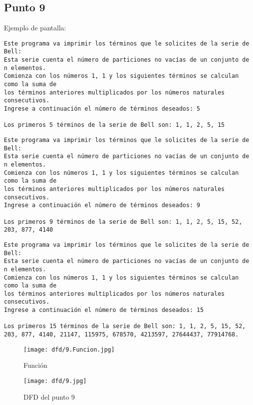 



\subsection{Punto 9}
	
	Ejemplo de pantalla:
\begin{lstlisting}
Este programa va imprimir los términos que le solicites de la serie de Bell: 
Esta serie cuenta el número de particiones no vacías de un conjunto de n elementos. 
Comienza con los números 1, 1 y los siguientes términos se calculan como la suma de 
los términos anteriores multiplicados por los números naturales consecutivos.
Ingrese a continuación el número de términos deseados: 5

Los primeros 5 términos de la serie de Bell son: 1, 1, 2, 5, 15
\end{lstlisting}

\begin{lstlisting}
Este programa va imprimir los términos que le solicites de la serie de Bell: 
Esta serie cuenta el número de particiones no vacías de un conjunto de n elementos. 
Comienza con los números 1, 1 y los siguientes términos se calculan como la suma de 
los términos anteriores multiplicados por los números naturales consecutivos.
Ingrese a continuación el número de términos deseados: 9

Los primeros 9 términos de la serie de Bell son: 1, 1, 2, 5, 15, 52, 203, 877, 4140
\end{lstlisting}

\begin{lstlisting}
Este programa va imprimir los términos que le solicites de la serie de Bell: 
Esta serie cuenta el número de particiones no vacías de un conjunto de n elementos. 
Comienza con los números 1, 1 y los siguientes términos se calculan como la suma de 
los términos anteriores multiplicados por los números naturales consecutivos.
Ingrese a continuación el número de términos deseados: 15

Los primeros 15 términos de la serie de Bell son: 1, 1, 2, 5, 15, 52, 203, 877, 4140, 21147, 115975, 678570, 4213597, 27644437, 77914768.
\end{lstlisting}

\begin{figure}
    \centering
    \texttt{[image: dfd/9.Funcion.jpg]}
    \caption{ Función}
    \label{fig: Función}
\end{figure}  
\begin{figure}
  \centering
  \texttt{[image: dfd/9.jpg]}
  \caption{ DFD del punto 9}
  \label{fig: DFD del punto 9}
\end{figure}

